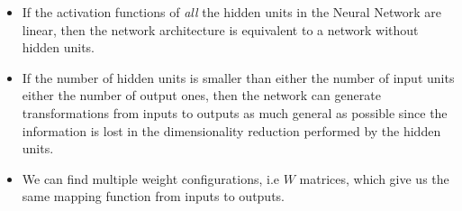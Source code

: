 \documentclass{standalone}
\begin{document}
\begin{itemize}

\item If the activation functions of \emph{all} the hidden units in the Neural Network are linear, then the network architecture is equivalent to a network without hidden units.

\item If the number of hidden units is smaller than either the number of input units either the number of output ones, then the network can generate transformations from inputs to outputs as much general as possible since the information is lost in the dimensionality reduction performed by the hidden units.

\item We can find multiple weight configurations, i.e $W$ matrices, which give us the same mapping function from inputs to outputs.

\end{itemize}
\end{document}
